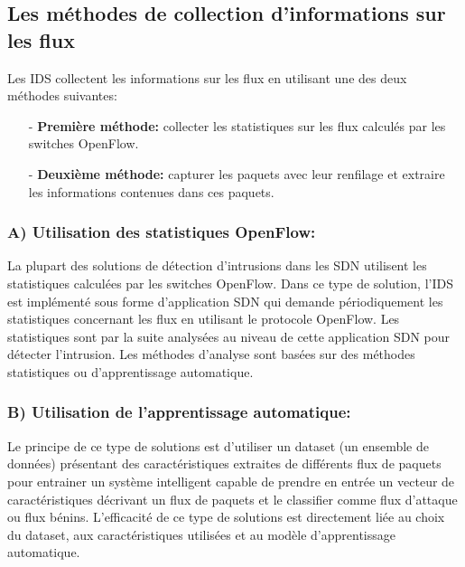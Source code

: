 \subsection{Les méthodes de collection d'informations sur les flux}
Les IDS collectent les informations sur les flux en utilisant une des deux méthodes suivantes:\\
\begin{itemize}
\item[-] \textbf{Première méthode:} collecter les statistiques sur les flux calculés par les switches OpenFlow.\\
\item[-] \textbf{Deuxième méthode:} capturer les paquets avec leur renfilage et extraire les informations contenues dans ces paquets. 
\end{itemize}

\subsubsection{A) Utilisation des statistiques OpenFlow:}
La plupart des solutions de détection d’intrusions dans les SDN utilisent les statistiques calculées par les switches OpenFlow. Dans ce type de solution, l’IDS est implémenté sous forme d’application SDN qui demande périodiquement les statistiques concernant les flux en utilisant le protocole OpenFlow. Les statistiques sont par la suite analysées au niveau de cette application SDN pour détecter l’intrusion. Les méthodes d’analyse sont basées sur des méthodes statistiques ou d’apprentissage automatique.

\subsubsection{B) Utilisation de l’apprentissage automatique:}
Le principe de ce type de solutions est d’utiliser un dataset (un ensemble de données) présentant des caractéristiques extraites de différents flux de paquets pour entrainer un système intelligent capable de prendre en entrée un vecteur de caractéristiques décrivant un flux de paquets et le classifier comme flux d’attaque ou flux bénins. L’efficacité de ce type de solutions est directement liée au choix du dataset, aux caractéristiques utilisées et au modèle d’apprentissage automatique.

